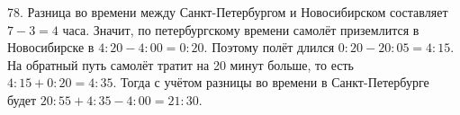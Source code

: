 78. Разница во времени между Санкт-Петербургом и Новосибирском составляет $7-3=4$ часа. Значит, по петербургскому времени самолёт приземлится в Новосибирске в $4:20-4:00=0:20.$ Поэтому полёт длился $0:20-20:05=4:15.$ На обратный путь самолёт тратит на 20 минут больше, то есть $4:15+0:20=4:35.$ Тогда с учётом разницы во времени в Санкт-Петербурге будет $20:55+4:35-4:00=21:30.$\\
